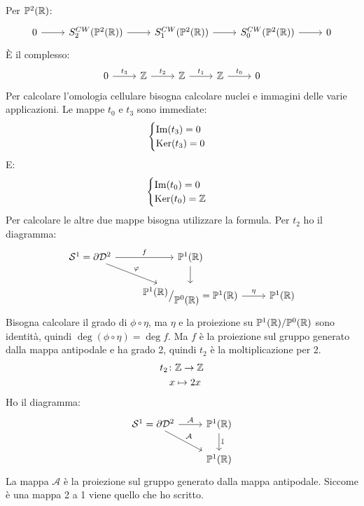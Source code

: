 \begin{example}[$\Pjr{2}$]
  Per $ \Pjr{2} $:
  \[
    \begin{tikzcd}
      0 \rar & S^{CW}_{2}(\Pjr{2}) \rar & S_1^{CW}(\Pjr{2}) \rar & S_{0}^{CW}(\Pjr{2}) \rar & 0
    \end{tikzcd}
  \]
  È il complesso:
  \[
    \begin{tikzcd}
      0 \rar{t_3} & \Z \rar{t_2} & \Z \rar{t_1} & \Z \rar{t_0} & 0
    \end{tikzcd}
  \]
  Per calcolare l'omologia cellulare bisogna calcolare nuclei e immagini
  delle varie applicazioni.
  Le mappe $ t_0 $ e $ t_3 $ sono immediate:
  \[
    \begin{cases}
      \mathrm{Im}( t_3 ) = 0 \\
      \mathrm{Ker}( t_3) = 0
    \end{cases}
  \]
  E:
  \[
    \begin{cases}
      \mathrm{Im}( t_0 ) = 0\\
      \mathrm{Ker}( t_0) = \mathbb{Z}
    \end{cases}
  \]
  Per calcolare le altre due mappe bisogna utilizzare la formula.
  Per $ t_2 $ ho il diagramma:
  \[
    \begin{tikzcd}
      \Sph{1} = \partial \Disk{2} \rar{f} \arrow{dr}{\phi} & \Pjr{1} \dar{} & {} \\
      {} & \quot{\Pjr{1}}{\Pjr{0}} = \Pjr{1} \rar{\eta} & \Pjr{1}
    \end{tikzcd}
  \]
  Bisogna calcolare il grado di $ \phi \circ \eta $, ma $ \eta $ e la proiezione su
  $ {\mathbb{P}^{1} (\mathbb{R})} \slash {\mathbb{P}^{0} (\mathbb{R})} $ sono identità, quindi
  $ \deg{(\phi \circ \eta)} = \deg{f} $. Ma $ f $ è la proiezione sul gruppo generato
  dalla mappa antipodale e ha grado 2, quindi $ t_2 $ è la moltiplicazione
  per 2.
  \begin{align*}
    t_2 \colon & \mathbb{Z} \to \mathbb{Z} \\
    x & \mapsto 2 x
  \end{align*}
  Ho il diagramma:
  \[
    \begin{tikzcd}
      \Sph{1} = \partial \Disk{2} \rar{\mathcal{A}} \arrow{dr}{\mathcal{A}} & \Pjr{1} \dar{\Id{}} \\
      {} & \Pjr{1}
    \end{tikzcd}
  \]
  La mappa $ \mathcal{A} $ è la proiezione sul gruppo generato dalla mappa antipodale.
  Siccome è una mappa 2 a 1 viene quello che ho scritto.


\end{example}
